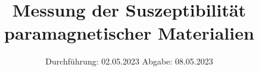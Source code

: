 

\subject{V606}
\title{Messung der Suszeptibilität paramagnetischer Materialien}
\date{%
  Durchführung: 02.05.2023
  \hspace{3em}
  Abgabe: 08.05.2023
}



\maketitle
\thispagestyle{empty}
\tableofcontents
\thispagestyle{empty}
\newpage
\setcounter{page}{1}





\printbibliography{}



